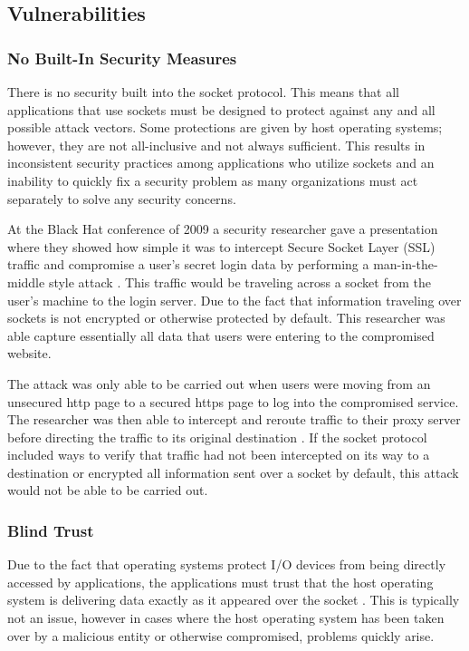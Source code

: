 \documentclass[conference, 12pt]{IEEEtran}
\begin{document}
\subsection{Vulnerabilities}
\subsubsection{No Built-In Security Measures}
There is no security built into the socket protocol. This means that all applications that use sockets must be designed to protect against any and all possible attack vectors. Some protections are given by host operating systems; however, they are not all-inclusive and not always sufficient. This results in inconsistent security practices among applications who utilize sockets and an inability to quickly fix a security problem as many organizations must act separately to solve any security concerns.

At the Black Hat conference of 2009 a security researcher gave a presentation where they showed how simple it was to intercept Secure Socket Layer (SSL) traffic and compromise a user’s secret login data by performing a man-in-the-middle style attack \cite{sheble_2009}. This traffic would be traveling across a socket from the user’s machine to the login server. Due to the fact that information traveling over sockets is not encrypted or otherwise protected by default. This researcher was able capture essentially all data that users were entering to the compromised website.

The attack was only able to be carried out when users were moving from an unsecured http page to a secured https page to log into the compromised service. The researcher was then able to intercept and reroute traffic to their proxy server before directing the traffic to its original destination \cite{sheble_2009}. If the socket protocol included ways to verify that traffic had not been intercepted on its way to a destination or encrypted all information sent over a socket by default, this attack would not be able to be carried out.


\subsubsection{Blind Trust}
Due to the fact that operating systems protect I/O devices from being directly accessed by applications, the applications must trust that the host operating system is delivering data exactly as it appeared over the socket \cite{ta2006splitting}. This is typically not an issue, however in cases where the host operating system has been taken over by a malicious entity or otherwise compromised, problems quickly arise.
\end{document}
